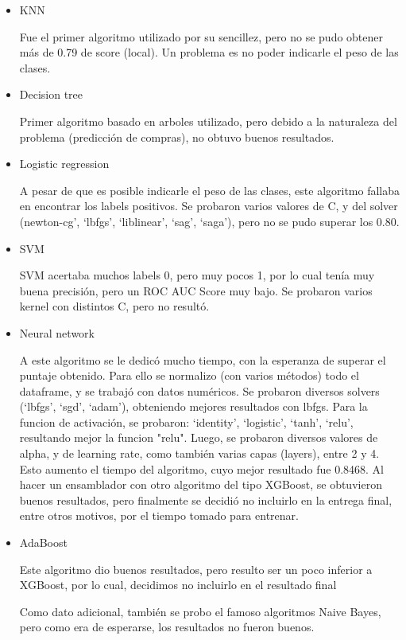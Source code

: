 \documentclass[a4paper ,12pt]{article}
\begin{document}
\begin{itemize}
	
	\item KNN
	
	Fue el primer algoritmo utilizado por su sencillez, pero no se pudo obtener más de 0.79 de score (local). Un problema es no poder indicarle el peso de las clases.
	
	\item Decision tree
	
	Primer algoritmo basado en arboles utilizado, pero debido a la naturaleza del problema (predicción de compras), no obtuvo buenos resultados. 
	
	\item Logistic regression
	
	A pesar de que es posible indicarle el peso de las clases, este algoritmo fallaba en encontrar los labels positivos. Se probaron varios valores de C, y del solver (newton-cg’, ‘lbfgs’, ‘liblinear’, ‘sag’, ‘saga’), pero no se pudo superar los 0.80.	
	
	\item SVM
	
	SVM acertaba muchos labels 0, pero muy pocos 1, por lo cual tenía muy buena precisión, pero un ROC AUC Score muy bajo. Se probaron varios kernel con distintos C, pero no resultó.
	
	\item Neural network 
	
	A este algoritmo se le dedicó mucho tiempo, con la esperanza de superar el puntaje obtenido. Para ello se normalizo (con varios métodos) todo el dataframe, y se trabajó con datos numéricos. 
	Se probaron diversos solvers (‘lbfgs’, ‘sgd’, ‘adam’), obteniendo mejores resultados con lbfgs. 
	Para la funcion de activación, se probaron: ‘identity’, ‘logistic’, ‘tanh’, ‘relu’, resultando mejor la funcion "relu".
	Luego, se probaron diversos valores de alpha, y de learning rate, como también varias capas (layers), entre 2 y 4. Esto aumento el tiempo del algoritmo, cuyo mejor resultado fue 0.8468. 
	Al hacer un ensamblador con otro algoritmo del tipo XGBoost, se obtuvieron buenos resultados, pero finalmente se decidió no incluirlo en la entrega final, entre otros motivos, por el tiempo tomado para entrenar.
	
	\item AdaBoost
	
	Este algoritmo dio buenos resultados, pero resulto ser un poco inferior a XGBoost, por lo cual, decidimos no incluirlo en el resultado final
	
	Como dato adicional, también se probo el famoso algoritmos Naive Bayes, pero como era de esperarse, los resultados no fueron buenos. 
	
	
	
\end{itemize}
\end{document}
